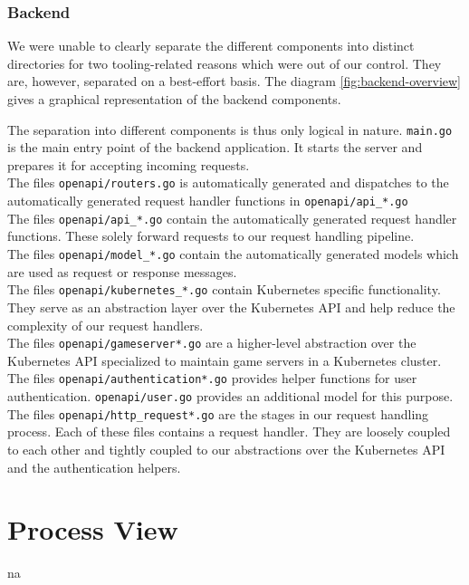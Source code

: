 \documentclass[a4paper,12pt,chapterprefix=false,bibliography=totoc,listof=totoc,]{scrreprt}
\begin{document}
\subsection{Backend}
We were unable to clearly separate the different components into distinct directories for two tooling-related reasons which were out of our control. They are, however, separated on a best-effort basis. The diagram \ref{fig:backend-overview} gives a graphical representation of the backend components.

The separation into different components is thus only logical in nature.
\texttt{main.go} is the main entry point of the backend application. It starts the server and prepares it for accepting incoming requests. \\
The files \texttt{openapi/routers.go} is automatically generated and dispatches to the automatically generated request handler functions in \texttt{openapi/api\_*.go} \\
The files \texttt{openapi/api\_*.go} contain the automatically generated request handler functions. These solely forward requests to our request handling pipeline. \\
The files \texttt{openapi/model\_*.go} contain the automatically generated models which are used as request or response messages. \\
The files \texttt{openapi/kubernetes\_*.go} contain Kubernetes specific functionality. They serve as an abstraction layer over the Kubernetes API and help reduce the complexity of our request handlers. \\
The files \texttt{openapi/gameserver*.go} are a higher-level abstraction over the Kubernetes API specialized to maintain game servers in a Kubernetes cluster.  \\
The files \texttt{openapi/authentication*.go} provides helper functions for user authentication. \texttt{openapi/user.go} provides an additional model for this purpose. \\
The files \texttt{openapi/http\_request*.go} are the stages in our request handling process. Each of these files contains a request handler. They are loosely coupled to each other and tightly coupled to our abstractions over the Kubernetes API and the authentication helpers.

\chapter{Process View}
\gls{na}
\end{document}
